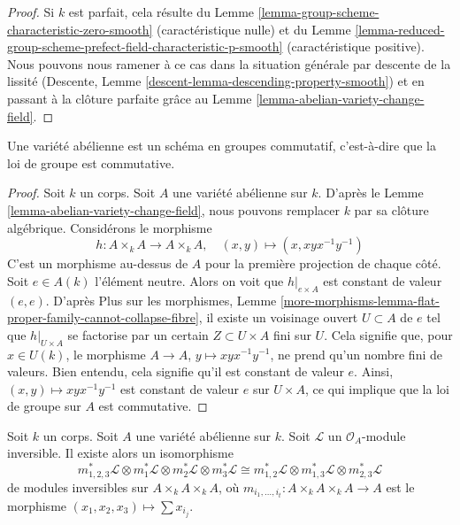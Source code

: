 \begin{proof}
Si $k$ est parfait, cela résulte du
Lemme \ref{lemma-group-scheme-characteristic-zero-smooth}
(caractéristique nulle) et du
Lemme \ref{lemma-reduced-group-scheme-prefect-field-characteristic-p-smooth}
(caractéristique positive).
Nous pouvons nous ramener à ce cas dans la situation générale par descente de la lissité
(Descente, Lemme \ref{descent-lemma-descending-property-smooth})
et en passant à la clôture parfaite grâce au
Lemme \ref{lemma-abelian-variety-change-field}.
\end{proof}

\begin{lemma}
\label{lemma-abelian-variety-abelian}
Une variété abélienne est un schéma en groupes commutatif, c'est-à-dire que la loi
de groupe est commutative.
\end{lemma}

\begin{proof}
Soit $k$ un corps. Soit $A$ une variété abélienne sur $k$.
D'après le Lemme \ref{lemma-abelian-variety-change-field}, nous pouvons remplacer
$k$ par sa clôture algébrique. Considérons le morphisme
$$
h : A \times_k A \longrightarrow A \times_k A,\quad
(x, y) \longmapsto (x, xyx^{-1}y^{-1})
$$
C'est un morphisme au-dessus de $A$ pour la première projection de chaque côté.
Soit $e \in A(k)$ l'élément neutre. Alors on voit que $h|_{e \times A}$ est
constant de valeur $(e, e)$. D'après Plus sur les morphismes, Lemme
\ref{more-morphisms-lemma-flat-proper-family-cannot-collapse-fibre},
il existe un voisinage ouvert $U \subset A$ de $e$
tel que $h|_{U \times A}$ se factorise par un certain $Z \subset U \times A$
fini sur $U$. Cela signifie que, pour $x \in U(k)$, le morphisme
$A \to A$, $y \mapsto xyx^{-1}y^{-1}$, ne prend qu'un nombre fini de valeurs.
Bien entendu, cela signifie qu'il est constant de valeur $e$. Ainsi,
$(x, y) \mapsto xyx^{-1}y^{-1}$ est
constant de valeur $e$ sur $U \times A$, ce qui implique
que la loi de groupe sur $A$ est commutative.
\end{proof}

\begin{lemma}
\label{lemma-apply-cube}
Soit $k$ un corps. Soit $A$ une variété abélienne sur $k$.
Soit $\mathcal{L}$ un $\mathcal{O}_A$-module inversible.
Il existe alors un isomorphisme
$$
m_{1, 2, 3}^*\mathcal{L} \otimes
m_1^*\mathcal{L} \otimes
m_2^*\mathcal{L} \otimes
m_3^*\mathcal{L} \cong
m_{1, 2}^*\mathcal{L} \otimes
m_{1, 3}^*\mathcal{L} \otimes
m_{2, 3}^*\mathcal{L}
$$
de modules inversibles sur $A \times_k A \times_k A$,
où $m_{i_1, \ldots, i_t} : A \times_k A \times_k A \to A$
est le morphisme $(x_1, x_2, x_3) \mapsto \sum x_{i_j}$.
\end{lemma}

